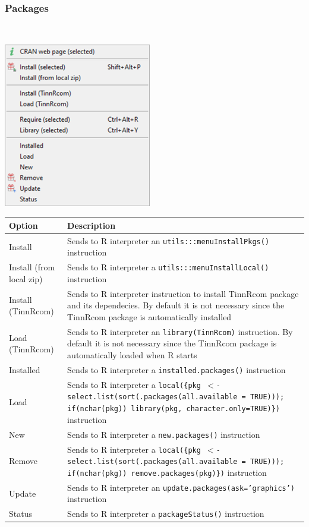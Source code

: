 \newpage
\hypertarget{menu_r_control_packages}{}
\subsubsection{Packages}\\

\includegraphics[scale=0.50]{./res/menu_r_control_packages.png}\\

\begin{scriptsize}\begin{tabularx}{\headwidth}{>{\hsize=0.2\hsize}X>{\hsize=0.7\hsize}X}\\
    \hline
    \textbf{Option} & \textbf{Description} \\
    \hline
    Install & Sends to R interpreter an \texttt{utils:::menuInstallPkgs()} instruction \\
    Install (from local zip) & Sends to R interpreter a \texttt{utils:::menuInstallLocal()} instruction \\
    Install (TinnRcom) & Sends to R interpreter instruction to install TinnRcom package and its dependecies.
      By default it is not necessary since the TinnRcom package is automatically installed \\
    Load (TinnRcom) & Sends to R interpreter an \texttt{library(TinnRcom)} instruction.
      By default it is not necessary since the TinnRcom package is automatically loaded when R starts \\
    Installed & Sends to R interpreter a \texttt{installed.packages()} instruction \\
    Load & Sends to R interpreter a \texttt{local(\{pkg $<$- select.list(sort(.packages(all.available = TRUE))); if(nchar(pkg)) library(pkg, character.only=TRUE)\})} instruction \\
    New & Sends to R interpreter a \texttt{new.packages()} instruction \\
    Remove & Sends to R interpreter a \texttt{local(\{pkg $<$- select.list(sort(.packages(all.available = TRUE))); if(nchar(pkg)) remove.packages(pkg)\})} instruction \\
    Update & Sends to R interpreter an \texttt{update.packages(ask='graphics')} instruction \\
    Status & Sends to R interpreter a \texttt{packageStatus()} instruction \\
    \hline
  \end{tabularx}\end{scriptsize}
